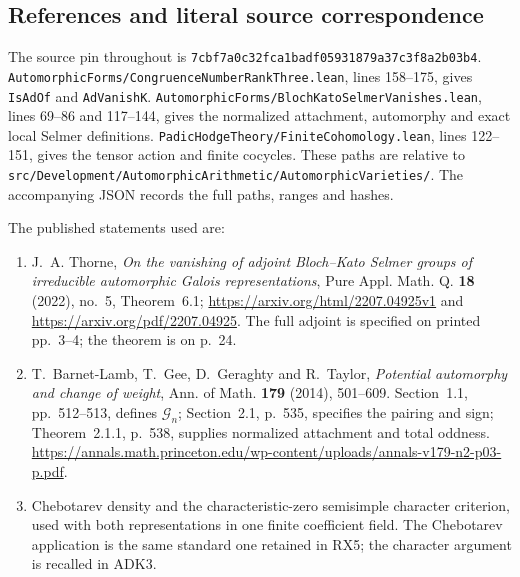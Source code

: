 \subsection{References and literal source correspondence}

The source pin throughout is
\texttt{7cbf7a0c32fca1badf05931879a37c3f8a2b03b4}.
\texttt{AutomorphicForms/CongruenceNumberRankThree.lean},
lines 158--175, gives \texttt{IsAdOf} and \texttt{AdVanishK}.
\texttt{AutomorphicForms/BlochKatoSelmerVanishes.lean},
lines 69--86 and 117--144, gives the normalized attachment,
automorphy and exact local Selmer definitions.
\texttt{PadicHodgeTheory/FiniteCohomology.lean},
lines 122--151, gives the tensor action and finite cocycles.
These paths are relative to
\texttt{src/Development/AutomorphicArithmetic/AutomorphicVarieties/}.
The accompanying JSON records the full paths, ranges and hashes.

The published statements used are:
\begin{enumerate}
\item J.~A. Thorne, \emph{On the vanishing of adjoint Bloch--Kato
  Selmer groups of irreducible automorphic Galois representations},
  Pure Appl. Math. Q. \textbf{18} (2022), no.~5, Theorem~6.1;
  \url{https://arxiv.org/html/2207.04925v1} and
  \url{https://arxiv.org/pdf/2207.04925}.  The full adjoint is
  specified on printed pp.~3--4; the theorem is on p.~24.
\item T.~Barnet-Lamb, T.~Gee, D.~Geraghty and R.~Taylor,
  \emph{Potential automorphy and change of weight},
  Ann. of Math. \textbf{179} (2014), 501--609.
  Section~1.1, pp.~512--513, defines $\mathcal G_n$;
  Section~2.1, p.~535, specifies the pairing and sign;
  Theorem~2.1.1, p.~538, supplies normalized attachment and
  total oddness.
  \url{https://annals.math.princeton.edu/wp-content/uploads/annals-v179-n2-p03-p.pdf}.
\item Chebotarev density and the characteristic-zero semisimple
  character criterion, used with both representations in one finite
  coefficient field.  The Chebotarev application is the same standard
  one retained in RX5; the character argument is recalled in ADK3.
\end{enumerate}
